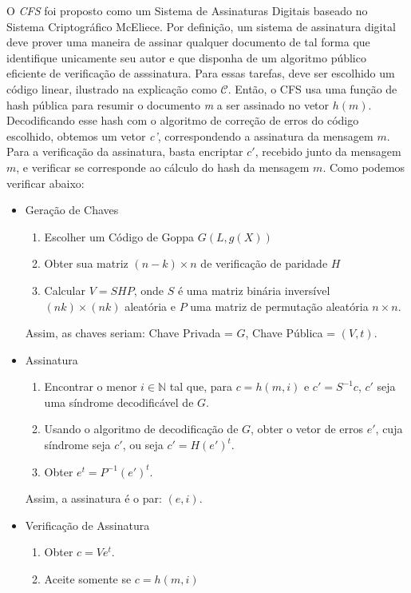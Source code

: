 \documentclass{SBCbookchapter}
\begin{document}
\begin{otherlanguage}{brazilian}
O \emph{CFS} foi proposto como um Sistema de Assinaturas Digitais baseado no Sistema Criptográfico McEliece. Por definição, um sistema de assinatura digital deve prover uma maneira de assinar qualquer documento de tal forma que identifique unicamente seu autor e que disponha de um algoritmo público eficiente de verificação de asssinatura. Para essas tarefas, deve ser escolhido um código linear, ilustrado na explicação como $\mathcal{C}$. Então, o CFS usa uma função de hash pública para resumir o documento \emph{m} a ser assinado no vetor $h(m)$. Decodificando esse hash com o algoritmo de correção de erros do código escolhido, obtemos um vetor \emph{c'}, correspondendo a assinatura da mensagem $m$. Para a verificação da assinatura, basta encriptar $c'$, recebido junto da mensagem $m$, e verificar se corresponde ao cálculo do hash da mensagem $m$. Como podemos verificar abaixo:

\begin{itemize}
    \item Geração de Chaves
    \begin{enumerate}
        \item Escolher um Código de Goppa $G(L,g(X))$
        \item Obter sua matriz $(n - k) \times n$ de verificação de paridade $H$
        \item Calcular $V = SHP$, onde $S$ é uma matriz binária inversível $(nk) \times (nk)$ aleatória e $P$ uma matriz de permutação aleatória $n \times n$.
    \end{enumerate}
    Assim, as chaves seriam: Chave Privada = $G$, Chave Pública = $(V,t)$.
    
    \item Assinatura
    \begin{enumerate}
        \item Encontrar o menor $i \in \mathbb{N}$ tal que, para $c = h(m,i)$ e $c' = S^{-1}c$, $c'$ seja uma síndrome decodificável de $G$.
        \item Usando o algoritmo de decodificação de $G$, obter o vetor de erros $e'$, cuja síndrome seja $c'$, ou seja $c' = H(e')^t$.
        \item Obter $e^t = P^{-1}(e')^t$.
    \end{enumerate}
    Assim, a assinatura é o par: $(e,i)$.
    
    \item Verificação de Assinatura
    \begin{enumerate}
        \item Obter $c = Ve^t$.
        \item Aceite somente se $c = h(m,i)$
    \end{enumerate}
\end{itemize}


\end{otherlanguage}
\end{document}
